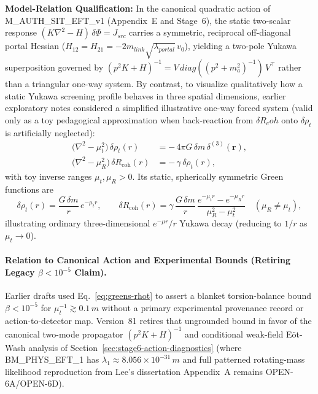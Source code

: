 \documentclass[american,11pt,letterpaper]{article}
\newcommand{\Rcoh}{R_{\mathrm{coh}}}
\def\mathrm#1{#1}%
\def\texttt#1{#1}%
\def\emph#1{#1}%
\def\Rcoh{R_coh}%
\begin{document}
\textbf{Model-Relation Qualification:} In the canonical quadratic action of \texttt{M\_AUTH\_SIT\_EFT\_v1} (Appendix~E and Stage~6), the static two-scalar response $(K\nabla^2 - H)\,\delta\Phi = J_{\mathrm{src}}$ carries a \emph{symmetric, reciprocal} off-diagonal portal Hessian ($H_{12} = H_{21} = -2 m_{\mathrm{link}}\sqrt{\lambda_{\mathrm{portal}}}\,v_0$), yielding a two-pole Yukawa superposition governed by $(p^2 K + H)^{-1} = V\,\mathrm{diag}((p^2+m_a^2)^{-1})\,V^\top$ rather than a triangular one-way system. By contrast, to visualize qualitatively how a static Yukawa screening profile behaves in three spatial dimensions, earlier exploratory notes considered a simplified \emph{illustrative one-way forced system} (valid only as a toy pedagogical approximation when back-reaction from $\delta\Rcoh$ onto $\delta\rho_t$ is artificially neglected):
\begin{align}
   \bigl(\nabla^2-\mu_t^2\bigr)\,\delta\rho_t(r) &= -\,4\pi G\,\delta
   m\,\delta^{(3)}(\boldsymbol{r}),\label{eq:greens-rhot}\\[4pt]
   \bigl(\nabla^2-\mu_R^2\bigr)\,\delta R_{\text{coh}}(r) &= -\,\gamma\,
   \delta\rho_t(r),\label{eq:greens-R}
\end{align}
with toy inverse ranges $\mu_t, \mu_R > 0$. Its static, spherically symmetric Green functions are
\[
   \delta\rho_t(r)=\frac{G\,\delta m}{r}\,e^{-\mu_t r},
   \qquad
   \delta R_{\text{coh}}(r)=
   \gamma\,\frac{G\,\delta m}{r}\,
   \frac{e^{-\mu_t r}-e^{-\mu_R r}}{\mu_R^2-\mu_t^2}
   \quad (\mu_R \ne \mu_t),
\]
illustrating ordinary three-dimensional $e^{-\mu r}/r$ Yukawa decay (reducing to $1/r$ as $\mu_t \to 0$).

\paragraph{Relation to Canonical Action and Experimental Bounds (Retiring Legacy $\beta < 10^{-5}$ Claim).}
Earlier drafts used Eq.~\eqref{eq:greens-rhot} to assert a blanket torsion-balance bound $\beta < 10^{-5}$ for $\mu_t^{-1} \gtrsim 0.1\,\mathrm{m}$ without a primary experimental provenance record or action-to-detector map. Version~81 retires that ungrounded bound in favor of the canonical two-mode propagator $(p^2 K + H)^{-1}$ and conditional weak-field E\"ot-Wash analysis of Section~\ref{sec:stage6-action-diagnostics} (where \texttt{BM\_PHYS\_EFT\_1} has $\lambda_1 \approx 8.056\times 10^{-31}\,\mathrm{m}$ and full patterned rotating-mass likelihood reproduction from Lee's dissertation Appendix~A remains \texttt{OPEN-6A}/\texttt{OPEN-6D}).
\end{document}
